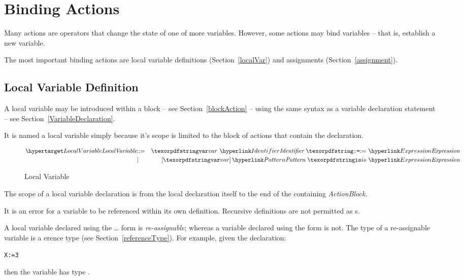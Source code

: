 \section{Binding Actions}
Many actions are operators that change the state of one of more variables. However, some actions may bind variables -- that is, establish a new variable.

The most important binding actions are local variable definitions (Section~\vref{localVar}) and assignments (Section~\vref{assignment}).

\subsection{Local Variable Definition}
\label{localVar}

A local variable may be introduced within a block -- see Section~\vref{blockAction} -- using the same syntax as a variable declaration statement -- see Section~\vref{VariableDeclaration}.
\begin{aside}
It is named a local variable simply because it's scope is limited to the block of actions that contain the declaration.
\end{aside}
\begin{figure}[htbp]
\begin{eqnarray*}
\ntDef{LocalVariable}&\arrow&\q{var}\ \ntRef{Identifier}\ \q{:=}\ \ntRef{Expression}\\
&\choice&[\q{var}]\,\ntRef{Pattern}\ \q{is}\ \ntRef{Expression}
\end{eqnarray*}
\caption{Local Variable}
\label{localVariableFig}
\end{figure}

The scope of a local variable declaration is from the local declaration itself to the end of the containing \emph{ActionBlock}.

\begin{aside}
It is an error for a variable to be referenced within its own definition. Recursive definitions are not permitted as s.
\end{aside}

A local variable declared using the \ldots\q{:=} form is \emph{re-assignable}; whereas a variable declared using the  form is not. The type of a re-assignable variable is a erence type (see Section~\vref{referenceType}). For example, given the  declaration:
\begin{alltt}
X := 3
\end{alltt}
then the variable  has type .

